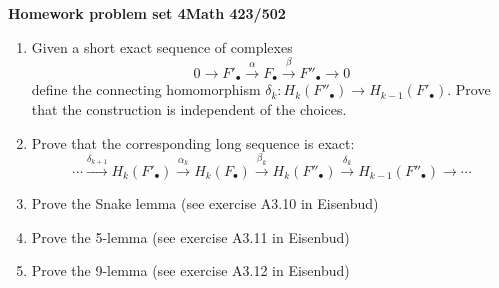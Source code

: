 \documentclass[12pt]{article}
\begin{document}
\begin{center}{\Large
\vspace{2cm}

\bf  Homework problem set 4\quad   Math 423/502\quad  \\
}
\vspace{.5in}

\end{center}

\begin{enumerate}
\item Given a short exact sequence of complexes 
\[
0\to F'_{\bullet}\xrightarrow{\,\, \alpha \,\,}
F_{\bullet}\xrightarrow{\,\,\beta \,\,} F''_{\bullet}\to 0
\]
define the connecting homomorphism $\delta_{k}:H_{k}(F''_{\bullet})\to
H_{k-1}(F'_{\bullet})$. Prove that the construction is independent of
the choices.
\item Prove that the corresponding long sequence is exact:
\[
\dotsb \xrightarrow{\delta_{k+1}}H_{k}(F'_{\bullet}) \xrightarrow{\alpha_{k} }H_{k}(F_{\bullet}) \xrightarrow{\beta_{k} }H_{k}(F''_{\bullet}) \xrightarrow{\delta_{k} }H_{k-1}(F''_{\bullet})\to \dotsb 
\]
\item Prove the Snake lemma (see exercise A3.10 in Eisenbud)
\item Prove the 5-lemma (see exercise A3.11 in Eisenbud)
\item Prove the 9-lemma (see exercise A3.12 in Eisenbud)
\end{enumerate}





          
\end{document}
